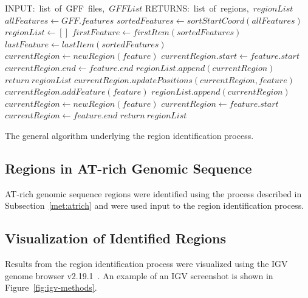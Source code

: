 \begin{algorithm}
  \begin{algorithmic}
    \State INPUT:\ list\ of\ GFF\ files,\ $GFFList$
    \State RETURNS:\ list\ of\ regions,\ $regionList$
    \State $allFeatures \gets GFF.features$
    \EndFor
    \State $sortedFeatures \gets sortStartCoord(allFeatures)$
    \State $regionList \gets []$
    \State $firstFeature \gets firstItem(sortedFeatures)$
    \State $lastFeature \gets lastItem(sortedFeatures)$
        \State $currentRegion \gets newRegion(feature)$
        \State $currentRegion.start \gets feature.start$
        \State $currentRegion.end \gets feature.end$
        \State $regionList.append(currentRegion)$
        \State $return\ regionList$
        \State $currentRegion.updatePositions(currentRegion, feature)$
        \State $currentRegion.addFeature(feature)$
      \Else
        \State $regionList.append(currentRegion)$
        \State $currentRegion \gets newRegion(feature)$
        \State $currentRegion \gets feature.start$
        \State $currentRegion \gets feature.end$
      \EndIf
    \EndFor
    \State $return\ regionList$
  \end{algorithmic}
  \caption{The general algorithm underlying the region identification
    process.}
  \label{alg:regions}
\end{algorithm}

\subsection{Regions in AT-rich Genomic Sequence}
\label{met:atrich2}
AT-rich genomic sequence regions were identified using the
process described in Subsection~\ref{met:atrich} and were used input to the region identification process.

\subsection{Visualization of Identified Regions}
\label{section:igv-met}
Results from the region identification process were visualized using
the IGV genome browser v2.19.1~\cite{robinson2011a}. An example of an
IGV screenshot is shown in Figure~\ref{fig:igv-methods}.

